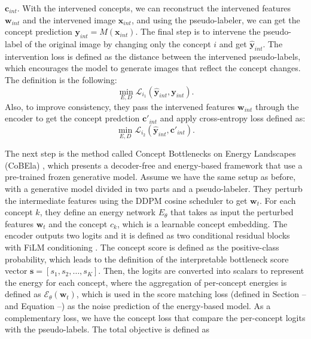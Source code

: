 \begin{itemize}
    $\mathbf{c}_{int}$. With the intervened concepts, we can reconstruct the intervened features $\mathbf{w}_{int}$ and the intervened image $\mathbf{x}_{int}$, and using the pseudo-labeler, we can 
    get the concept prediction $\mathbf{y}_{int} = M(\mathbf{x}_{int})$. The final step is to intervene the pseudo-label of the original image by changing only the concept $i$ and get 
    $\mathbf{\hat y}_{int}$. The intervention loss is defined as the distance between the intervened pseudo-labels, which encourages the model to generate images that reflect the concept changes. 
    The definition is the following: 
    \begin{equation}
        \min_{E,D} \mathcal{L}_{i_1}(\mathbf{\hat y}_{int}, \mathbf{y}_{int}).
    \end{equation}
    Also, to improve consistency, they pass the intervened features $\mathbf{w}_{int}$ through the encoder to get the concept predction $\mathbf{c'}_{int}$ and apply cross-entropy loss defined as:
    \begin{equation}
        \min_{E, D} \mathcal{L}_{i_2}(\mathbf{\hat y}_{int}, \mathbf{c'}_{int}).
    \end{equation}
\end{itemize}
The next step is the method called Concept Bottlenecks on Energy Landscapes (CoBEla) \cite{kim2026cobelasteeringtransparentgeneration}, which presents a decoder-free and 
energy-based framework that use a pre-trained frozen generative model. Assume we have the same setup as before, with a generative model divided in two parts and a pseudo-labeler. 
They perturb the intermediate features using the DDPM cosine scheduler to get $\mathbf{w}_t$. For each concept $k$, they define an energy network $E_{\theta}$ that takes as input 
the perturbed features $\mathbf{w}_t$ and the concept $c_k$, which is a learnable concept embedding. The encoder outputs two logits and it is defined as two conditional residual blocks with 
FiLM conditioning \cite{perez2017filmvisualreasoninggeneral}. The concept score is defined as the positive-class probability, which leads to the definition of the interpretable bottleneck score vector
$\mathbf{s} = [s_1, s_2, \ldots, s_K]$. Then, the logits are converted into scalars to represent the energy for each concept, where the aggregation of per-concept energies is defined as 
$\mathcal{E}_{\theta}(\mathbf{w}_t)$, which is used in the score matching loss (defined in Section -- and Equation --) as the noise prediction of the energy-based model. As a complementary loss, 
we have the concept loss that compare the per-concept logits with the pseudo-labels. The total objective is defined as 
